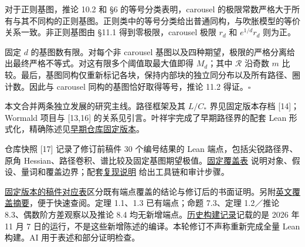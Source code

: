\documentclass[11pt,a4paper]{article}
\makeatletter
\renewcommand\section{\@startsection{section}{1}{\z@}{-2.8ex plus -1ex minus -.2ex}{1.1ex plus .2ex}{\normalfont\large\bfseries}}
\makeatother
\begin{document}
对于正则基图，推论 10.2 和 §6 的等号分类表明，carousel 的极限常数严格大于所有与其不同构的正则基图。正则类中的等号分类给出普通同构，与吹胀模型的等价关系一致。非正则基图由 §11.1 得到零极限，carousel 极限 \(r_d\) 和 \(e^{1/d}r_d\) 则为正。

固定 \(d\) 的基图数有限。对每个非 carousel 基图以及四种期望，极限的严格分离给出最终严格不等式。对这有限多个阈值取最大值即得 \(M_d\)；其中 \(\mathcal R\) 沿奇数 \(m\) 比较。最后，基图同构仅重新标记各块，保持内部块的独立同分布以及所有路径、圈计数。因此与 carousel 同构的基图恰好取得等号，推论 11.2 得证。\(\square\)

\section{作者说明}\label{ux4f5cux8005ux8bf4ux660e}

本文合并两条独立发展的研究主线。路径框架及其 \(L/C_*\) 界见固定版本存档 {[}14{]}；Wormald 项目与 {[}13,16{]} 的关系见引言。叶祥宇完成了早期路径界的配套 Lean 形式化，精确陈述见\href{https://github.com/LStar404/tournament-hamiltonian-paths/blob/a01680d39647bc4fa2f88d56b4e01a4b8dc98d48/formalization/VERIFICATION.md}{早期仓库固定版本}。

仓库快照 {[}17{]} 记录了修订前稿件 30 个编号结果的 Lean 端点，包括尖锐路径界、原角 Hessian、路径卷积、谱比较及固定基图期望极值。\href{https://github.com/LStar404/tournament-hamiltonian-counts-20261028/blob/c678e9ee24fb304cad755a27c99f511c8640f75e/formal/COVERAGE.zh.md}{固定覆盖表} 说明对象、假设、量词和覆盖边界；配套\href{https://github.com/LStar404/tournament-hamiltonian-counts-20261028/blob/c678e9ee24fb304cad755a27c99f511c8640f75e/formal/README.zh.md}{复现说明} 给出工具链和审计步骤。

\href{https://github.com/LStar404/tournament-hamiltonian-counts-20261028/blob/1b66d66cd287310c3a85dc3c64816fa319d55af2/review/revision-20261111/lean_correspondence.md}{固定版本的稿件对应表}区分既有端点覆盖的结论与修订后的书面证明。另附\href{https://github.com/LStar404/tournament-hamiltonian-counts-20261028/blob/fbe1b67e72c6119d865c801455e829329dea0c2a/review/revision-20261111-round2/lean_coverage.en.md}{英文覆盖摘要}，便于快速查阅。定理 1.1、1.3 已有端点；命题 7.3、定理 1.2／推论 8.3、偶数阶方差观察以及推论 8.4 均无新增端点。\href{https://github.com/LStar404/tournament-hamiltonian-counts-20261028/blob/1b66d66cd287310c3a85dc3c64816fa319d55af2/review/lean-rerun-20261107/summary.json}{历史构建记录}记载的是 2026 年 11 月 7 日的运行，不是这些新增陈述的编译。本轮修订不声称重新完成全量 Lean 构建。AI 用于表述和部分证明检查。
\end{document}
